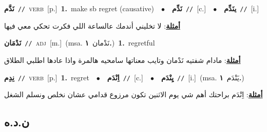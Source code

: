 \documentclass[10pt,a4paper,twoside]{article} %
\begin{document}
\begin{multicols}{2}
{\setlength\topsep{0pt}\textbf{\foreignlanguage{arabic}{نَدَّم}}\ {\color{gray}\texttt{//}\color{black}}\ \textsc{verb}\ [p.]\ \textbf{1.}~make sb regret (causative)\ \ $\bullet$\ \ \setlength\topsep{0pt}\textbf{\foreignlanguage{arabic}{نَدِّم}}\ {\color{gray}\texttt{//}\color{black}}\ [c.]\ \ $\bullet$\ \ \setlength\topsep{0pt}\textbf{\foreignlanguage{arabic}{ينَدِّم}}\ {\color{gray}\texttt{//}\color{black}}\ [i.]\  \begin{flushright}\color{gray}\foreignlanguage{arabic}{\textbf{\underline{\foreignlanguage{arabic}{أمثلة}}}: لا تخليني أندمك عالساعة اللي فكرت تحكي معي فيها}\end{flushright}\color{black}} \vspace{2mm}

{\setlength\topsep{0pt}\textbf{\foreignlanguage{arabic}{نَدْمَان}}\ {\color{gray}\texttt{//}\color{black}}\ \textsc{adj}\ [m.]\ \color{gray}(msa. \foreignlanguage{arabic}{نَدْمان}~\foreignlanguage{arabic}{\textbf{١.}})\color{black}\ \textbf{1.}~regretful\  \begin{flushright}\color{gray}\foreignlanguage{arabic}{\textbf{\underline{\foreignlanguage{arabic}{أمثلة}}}: مادام شفتيه نَدْمان وتايب معناتها سامحيه هالمرة واذا عادها اطلبي الطلاق}\end{flushright}\color{black}} \vspace{2mm}

{\setlength\topsep{0pt}\textbf{\foreignlanguage{arabic}{نِدِم}}\ {\color{gray}\texttt{//}\color{black}}\ \textsc{verb}\ [p.]\ \textbf{1.}~regret\ \ $\bullet$\ \ \setlength\topsep{0pt}\textbf{\foreignlanguage{arabic}{اِنْدَم}}\ {\color{gray}\texttt{//}\color{black}}\ [c.]\ \ $\bullet$\ \ \setlength\topsep{0pt}\textbf{\foreignlanguage{arabic}{يِنْدَم}}\ {\color{gray}\texttt{//}\color{black}}\ [i.]\ \color{gray}(msa. \foreignlanguage{arabic}{يَنْدَم}~\foreignlanguage{arabic}{\textbf{١.}})\color{black}\  \begin{flushright}\color{gray}\foreignlanguage{arabic}{\textbf{\underline{\foreignlanguage{arabic}{أمثلة}}}: اِنْدَم براحتك أهم شي يوم الاثنين تكون مرزوع قدامي عشان نخلص ونسلم الشغل}\end{flushright}\color{black}} \vspace{2mm}

\vspace{-3mm}
\subsection*{\color{blue}\foreignlanguage{arabic}{ن.د.ه}\color{blue}{}} 


\end{multicols}
\end{document}
